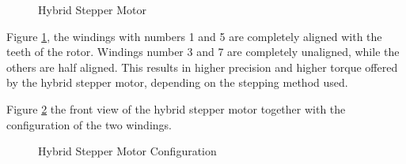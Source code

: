 \begin{figure}[htp]
    \centering%
    \hfill%
    \caption{Hybrid Stepper Motor}
    \label{fig:stepper}
\end{figure}
\newpage
Figure \ref{fig:stepper}, the windings with numbers 1 and 5 are completely aligned with the teeth of the rotor. Windings number 3 and 7 are completely unaligned, while the others are half aligned. This results in higher precision and higher torque offered by the hybrid stepper motor, depending on the stepping method used.

Figure \ref{fig:hybrid_stepper} the front view of the hybrid stepper motor together with the configuration of the two windings.

\begin{figure}[htp]
    \centering%
    \hfill%
    \caption{Hybrid Stepper Motor Configuration}%
    \label{fig:hybrid_stepper}
\end{figure}

